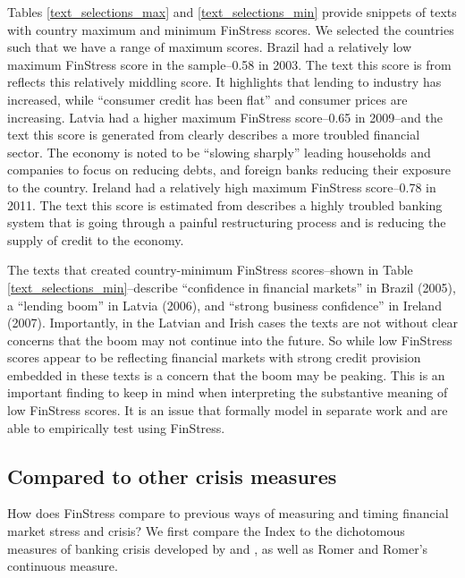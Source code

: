 \documentclass[]{article}
\begin{document}
Tables \ref{text_selections_max} and \ref{text_selections_min} provide snippets of texts with country maximum and minimum FinStress scores. We selected the countries such that we have a range of maximum scores. Brazil had a relatively low maximum FinStress score in the sample--0.58 in 2003. The text this score is from reflects this relatively middling score. It highlights that lending to industry has increased, while ``consumer credit has been flat'' and consumer prices are increasing. Latvia had a higher maximum FinStress score--0.65 in 2009--and the text this score is generated from clearly describes a more troubled financial sector. The economy is noted to be ``slowing sharply'' leading households and companies to focus on reducing debts, and foreign banks reducing their exposure to the country. Ireland had a relatively high maximum FinStress score--0.78 in 2011. The text this score is estimated from describes a highly troubled banking system that is going through a painful restructuring process and is reducing the supply of credit to the economy.

The texts that created country-minimum FinStress scores--shown in Table \ref{text_selections_min}--describe ``confidence in financial markets'' in Brazil (2005), a ``lending boom'' in Latvia (2006), and ``strong business confidence'' in Ireland (2007). Importantly, in the Latvian and Irish cases the texts are not without clear concerns that the boom may not continue into the future. So while low FinStress scores appear to be reflecting financial markets with strong credit provision embedded in these texts is a concern that the boom may be peaking. This is an important finding to keep in mind when interpreting the substantive meaning of low FinStress scores. It is an issue that \cite{gandrud_pepinsky2015} formally model in separate work and are able to empirically test using FinStress.

\subsection{Compared to other crisis
measures}\label{comparison-to-other-crisis-measures}

How does FinStress compare to previous ways of measuring and timing financial market stress and crisis? We first compare the Index to the dichotomous measures of banking crisis developed by \cite{Reinhart2009} and \cite{laeven2013}, as well as Romer and Romer's \citeyearpar{Romer2015} continuous measure.
\end{document}
